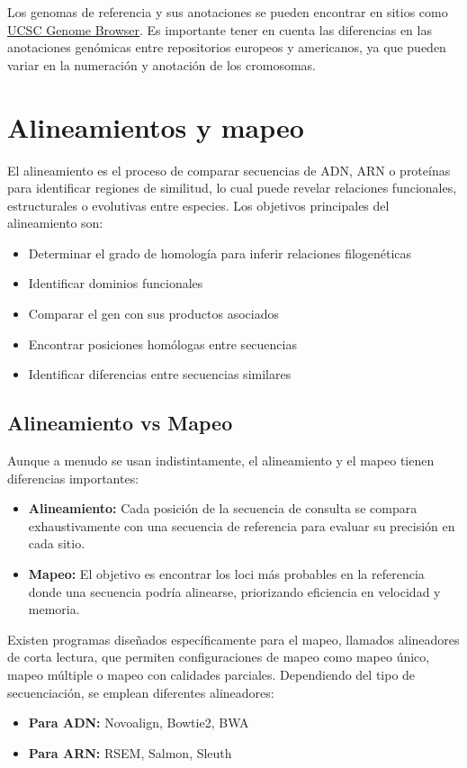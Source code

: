 \begin{itemize}
Los genomas de referencia y sus anotaciones se pueden encontrar en sitios como \href{https://hgdownload.soe.ucsc.edu/downloads.html}{UCSC Genome Browser}. Es importante tener en cuenta las diferencias en las anotaciones genómicas entre repositorios europeos y americanos, ya que pueden variar en la numeración y anotación de los cromosomas.

\section{Alineamientos y mapeo}
El alineamiento es el proceso de comparar secuencias de ADN, ARN o proteínas para identificar regiones de similitud, lo cual puede revelar relaciones funcionales, estructurales o evolutivas entre especies. Los objetivos principales del alineamiento son:
\begin{itemize}
\item Determinar el grado de homología para inferir relaciones filogenéticas
\item Identificar dominios funcionales
\item Comparar el gen con sus productos asociados
\item Encontrar posiciones homólogas entre secuencias
\item Identificar diferencias entre secuencias similares
\end{itemize}

\subsection{Alineamiento vs Mapeo}
Aunque a menudo se usan indistintamente, el alineamiento y el mapeo tienen diferencias importantes:
\begin{itemize}
\item \textbf{Alineamiento:} Cada posición de la secuencia de consulta se compara exhaustivamente con una secuencia de referencia para evaluar su precisión en cada sitio.
\item \textbf{Mapeo:} El objetivo es encontrar los loci más probables en la referencia donde una secuencia podría alinearse, priorizando eficiencia en velocidad y memoria.
\end{itemize}

Existen programas diseñados específicamente para el mapeo, llamados alineadores de corta lectura, que permiten configuraciones de mapeo como mapeo único, mapeo múltiple o mapeo con calidades parciales. Dependiendo del tipo de secuenciación, se emplean diferentes alineadores:
\begin{itemize}
\item \textbf{Para ADN:} Novoalign, Bowtie2, BWA
\item \textbf{Para ARN:} RSEM, Salmon, Sleuth
\end{itemize}


\end{itemize}
